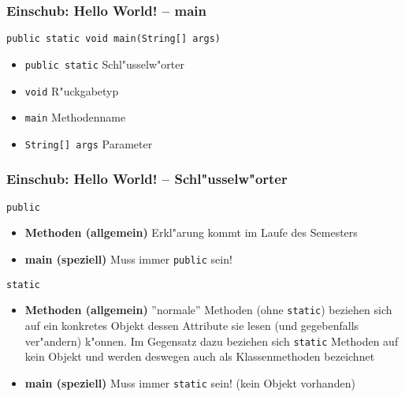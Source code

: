 \documentclass{beamer}
\begin{document}
\begin{frame}
\frametitle{Einschub: Hello World! -- main}

\pause
\begin{block}{\texttt{public static void main(String[] args)}}
\begin{itemize}
\item \texttt{public static} Schl"usselw"orter\\
\item \texttt{void} R"uckgabetyp\\
\item \texttt{main} Methodenname\\
\item \texttt{String[] args} Parameter
\end{itemize}
\end{block}
\end{frame}


\begin{frame}
\frametitle{Einschub: Hello World! -- Schl"usselw"orter}
\begin{block}{\texttt{public}}
\begin{itemize}
\item \textbf{Methoden (allgemein)} Erkl"arung kommt im Laufe des Semesters
\item \textbf{main (speziell)} Muss immer \texttt{public} sein!
\end{itemize}
\end{block}

\pause

\begin{block}{\texttt{static}}
\begin{itemize}
\item \textbf{Methoden (allgemein)} ''normale'' Methoden (ohne \texttt{static}) beziehen sich auf ein konkretes Objekt dessen Attribute sie lesen (und gegebenfalls ver"andern) k"onnen. Im Gegensatz dazu beziehen sich \texttt{static} Methoden auf \alert{kein Objekt} und werden deswegen auch als Klassenmethoden bezeichnet
\item \textbf{main (speziell)} Muss immer \texttt{static} sein! (kein Objekt vorhanden)
\end{itemize}
\end{block}
\end{frame}
\end{document}
